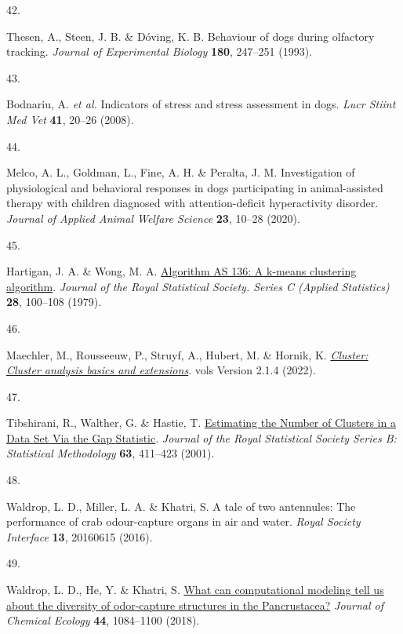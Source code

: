 \documentclass[
]{article}
\newlength{\cslhangindent}
\newlength{\csllabelwidth}
\newlength{\cslentryspacingunit} %
\newenvironment{CSLReferences}[2] %
 {%
  \setlength{\parindent}{0pt}
  \ifodd #1
  \let\oldpar\par
  \def\par{\hangindent=\cslhangindent\oldpar}
  \fi
  \setlength{\parskip}{#2\cslentryspacingunit}
 }%
 {}
\newcommand{\CSLLeftMargin}[1]{\parbox[t]{\csllabelwidth}{#1}}
\newcommand{\CSLRightInline}[1]{\parbox[t]{\linewidth - \csllabelwidth}{#1}\break}
\begin{document}
\begin{CSLReferences}{0}{0}
\leavevmode{}%
\CSLLeftMargin{42. }%
\CSLRightInline{Thesen, A., Steen, J. B. \& Dóving, K. B. Behaviour of dogs during olfactory tracking. \emph{Journal of Experimental Biology} \textbf{180}, 247--251 (1993).}

\leavevmode{}%
\CSLLeftMargin{43. }%
\CSLRightInline{Bodnariu, A. \emph{et al.} Indicators of stress and stress assessment in dogs. \emph{Lucr Stiint Med Vet} \textbf{41}, 20--26 (2008).}

\leavevmode{}%
\CSLLeftMargin{44. }%
\CSLRightInline{Melco, A. L., Goldman, L., Fine, A. H. \& Peralta, J. M. Investigation of physiological and behavioral responses in dogs participating in animal-assisted therapy with children diagnosed with attention-deficit hyperactivity disorder. \emph{Journal of Applied Animal Welfare Science} \textbf{23}, 10--28 (2020).}

\leavevmode{}%
\CSLLeftMargin{45. }%
\CSLRightInline{Hartigan, J. A. \& Wong, M. A. \href{http://www.jstor.org/stable/2346830}{Algorithm AS 136: A k-means clustering algorithm}. \emph{Journal of the Royal Statistical Society. Series C (Applied Statistics)} \textbf{28}, 100--108 (1979).}

\leavevmode{}%
\CSLLeftMargin{46. }%
\CSLRightInline{Maechler, M., Rousseeuw, P., Struyf, A., Hubert, M. \& Hornik, K. \emph{\href{https://CRAN.R-project.org/package=cluster}{Cluster: Cluster analysis basics and extensions}}. vols Version 2.1.4 (2022).}

\leavevmode{}%
\CSLLeftMargin{47. }%
\CSLRightInline{Tibshirani, R., Walther, G. \& Hastie, T. \href{https://doi.org/10.1111/1467-9868.00293}{Estimating the {Number} of {Clusters} in a {Data} {Set} {Via} the {Gap} {Statistic}}. \emph{Journal of the Royal Statistical Society Series B: Statistical Methodology} \textbf{63}, 411--423 (2001).}

\leavevmode{}%
\CSLLeftMargin{48. }%
\CSLRightInline{Waldrop, L. D., Miller, L. A. \& Khatri, S. A tale of two antennules: The performance of crab odour-capture organs in air and water. \emph{Royal Society Interface} \textbf{13}, 20160615 (2016).}

\leavevmode{}%
\CSLLeftMargin{49. }%
\CSLRightInline{Waldrop, L. D., He, Y. \& Khatri, S. \href{https://doi.org/10.1007/s10886-018-1017-2}{What can computational modeling tell us about the diversity of odor-capture structures in the {P}ancrustacea?} \emph{Journal of Chemical Ecology} \textbf{44}, 1084--1100 (2018).}


\end{CSLReferences}
\end{document}
